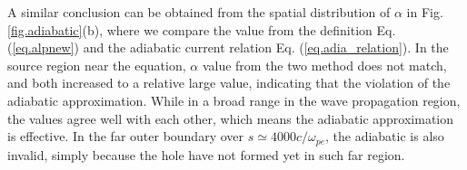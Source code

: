 A similar conclusion can be obtained from the spatial distribution of $\alpha$ in Fig. \ref{fig.adiabatic}(b), where we compare the value from the definition Eq. (\ref{eq.alpnew}) and the adiabatic current relation Eq. (\ref{eq.adia_relation}). 
In the source region near the equation, $\alpha$ value from the two method does not match, and both increased to a relative large value, indicating that the violation of the adiabatic approximation.
While in a broad range in the wave propagation region, the values agree well with each other, which means the adiabatic approximation is effective.
In the far outer boundary over $s\simeq4000c/\omega_{pe}$, the adiabatic is also invalid, simply because the hole have not formed yet in such far region.
